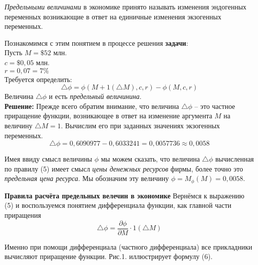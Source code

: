 \documentclass[12pt,a4paper]{article}
\begin{document}
\textit{Предельными величинами} в экономике принято называть изменения эндогенных переменных возникающие в ответ на единичные изменения экзогенных переменных.

Познакомимся с этим понятием в процессе решения \textbf{задачи}:\\
Пусть $M = \$52$ млн.\\
$c = \$ 0,05$ млн. \\
$r = 0,07 = 7\%$\\
Требуется определить: \\
\begin{equation}
\triangle \phi = \phi(M+1(\triangle M), c, r) - \phi(M,c,r)
\end{equation}
Величина $\triangle \phi$ и есть \textit{предельный величинина}.\\
\textbf{Решение:}
Прежде всего обратим внимание, что величина $\triangle \phi$ -- это частное приращение функции, возникающее в ответ на изменение аргумента $M$ на величину $\triangle M = 1$. Вычислим его при заданных значениях экзогенных переменных.
$$\triangle \phi = 0,6090977 - 0,6033241 = 0,0057736 \approx 0,0058$$

Имея ввиду смысл величины $\phi$ мы можем сказать, что величина $\triangle \phi$ вычисленная по правилу (5) имеет смысл \textit{цены денежных ресурсов} фирмы, более точно это \textit{предельная цена ресурса}. Мы обозначим эту величину $\phi = M_{\phi}(M) = 0,0058$.

\textbf{Правила расчёта предельных велечин в экономике}
Вернёмся к выражению (5) и воспользуемся понятием дифференциала функции, как главной части приращения
\begin{equation}
\triangle \phi = \frac{\partial \phi}{\partial M} \cdot 1(\triangle M)
\end{equation}

Именно при помощи дифференциала (частного дифференциала) все прикладники вычисляют приращение функции. Рис.1. иллюстрирует формулу (6).

\end{document}
